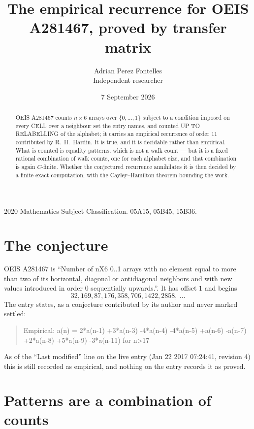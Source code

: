 \documentclass[11pt,a4paper]{article}
\title{The empirical recurrence for OEIS A281467, proved by transfer matrix}
\author{Adrian Perez Fontelles\\ \small Independent researcher}
\date{7 September 2026}
\theoremstyle{plain}
\theoremstyle{definition}
\begin{document}
\maketitle

\begin{abstract}
OEIS A281467 counts $n\times6$ arrays over $\{0,\dots,1\}$ subject to a condition imposed on
every CELL over a neighbour set the entry names, and counted UP TO RELABELLING of the
alphabet; it carries an empirical recurrence of order $11$ contributed by
R.~H.~Hardin. It is true, and it is decidable rather than empirical. What is counted is
equality patterns, which is not a walk count --- but it is a fixed rational combination of
walk counts, one for each alphabet size, and that combination is again $C$-finite. Whether the
conjectured recurrence annihilates it is then decided by a finite exact computation, with the
Cayley--Hamilton theorem bounding the work.
\end{abstract}

\noindent\small 2020 Mathematics Subject Classification. 05A15, 05B45, 15B36.\normalsize

\section{The conjecture}

OEIS A281467 is ``Number of nX6 0..1 arrays with no element equal to more than two of its horizontal, diagonal or antidiagonal neighbors and with new values introduced in order 0 sequentially upwards.''. It has offset $1$ and begins
\[
32, 169, 87, 176, 358, 706, 1422, 2858,\ \dots
\]
The entry states, as a conjecture contributed by its author and never marked settled:
\begin{quote}
Empirical: a(n) = 2*a(n-1) +3*a(n-3) -4*a(n-4) -4*a(n-5) +a(n-6) -a(n-7) +2*a(n-8) +5*a(n-9) -3*a(n-11) for n>17
\end{quote}
As of the ``Last modified'' line on the live entry (Jan 22 2017 07:24:41, revision 4) this is still
recorded as empirical, and nothing on the entry records it as proved.

\section{Patterns are a combination of counts}
\end{document}
